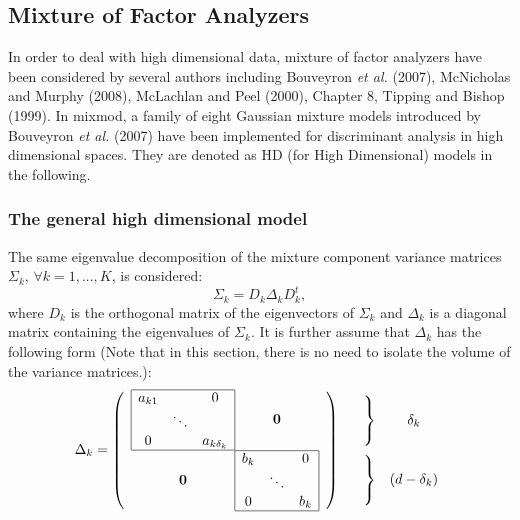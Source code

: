 \documentclass[12pt]{article}
\begin{document}
\subsection{Mixture of Factor Analyzers}
In order to deal with high dimensional data, mixture of factor analyzers have been considered
by several authors including Bouveyron {\it et al.} (2007), McNicholas and Murphy (2008),
McLachlan and Peel (2000), Chapter 8, Tipping and Bishop (1999).  In {\sc mixmod}, a family of
eight Gaussian mixture models introduced by Bouveyron \emph{et al.} (2007) have been
implemented for discriminant analysis in high dimensional spaces.  They are denoted as HD (for
High Dimensional) models in the following.

\subsubsection{The general high dimensional model}
The same eigenvalue decomposition of the mixture component variance matrices $\Sigma_k$,
$\forall k=1,...,K$, is considered:
$$\Sigma_k = D_{k} \Delta_k D_{k}^{t},$$
where $D_{k}$ is the orthogonal matrix of the eigenvectors of $\Sigma_{k}$ and $\Delta_{k}$ is
a diagonal matrix containing the eigenvalues of $\Sigma_{k}$. It is further assume that
$\Delta_{k}$ has the following form (Note that in this section, there is no need to isolate the
volume of the variance matrices.):
$$\Delta_k=
\left(
  \begin{array}{c@{}c}
    \begin{array}{|ccc|}
      \hline
      a_{k1} & & 0\\
      & \ddots & \\
      0 & & a_{k\delta_k}\\
      \hline
    \end{array}
    &
    \mathbf{0}\\
    \mathbf{0}
    &
    \begin{array}{|ccc|}
      \hline
      b_k & & 0\\
      & \ddots &\\
      0 & & b_k\\
      \hline
    \end{array}
  \end{array}
\right)
\begin{array}{cc}
  \left.
    \begin{array}{c}
      \\\\\\
    \end{array}\right\}
  &
  \delta_{k}\vspace{1.5ex}\\
  \left.
    \begin{array}{c}
      \\\\\\
    \end{array}
  \right\}
  & (d-\delta_{k})
\end{array}
$$
\end{document}
